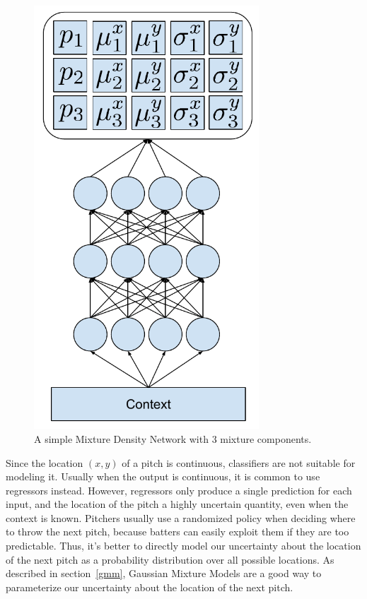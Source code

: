 \documentclass{article}
\begin{document}
\begin{figure}
\centering
\includegraphics[angle=-90,width=0.75\textwidth]{mdn}
\caption{A simple Mixture Density Network with 3 mixture components.}
\label{example-mdn}
\end{figure}

Since the location $(x,y)$ of a pitch is continuous, classifiers are not suitable for modeling it.  Usually when the output is continuous, it is common to use regressors instead.  However, regressors only produce a single prediction for each input, and the location of the pitch a highly uncertain quantity, even when the context is known.  Pitchers usually use a randomized policy when deciding where to throw the next pitch, because batters can easily exploit them if they are too predictable.  Thus, it's better to directly model our uncertainty about the location of the next pitch as a probability distribution over all possible locations.  As described in section~\ref{gmm}, Gaussian Mixture Models are a good way to parameterize our uncertainty about the location of the next pitch.
\end{document}

